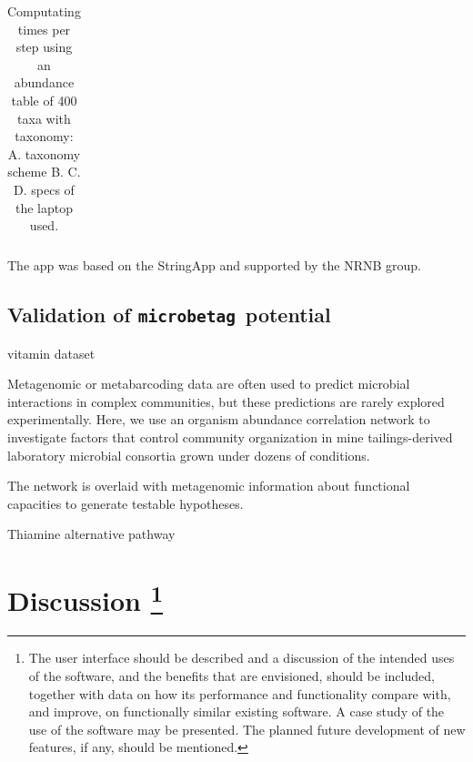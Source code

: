 \documentclass[sn-mathphys,Numbered, lineno]{sn-jnl}  %
\theoremstyle{thmstyleone}%
\theoremstyle{thmstyletwo}%
\theoremstyle{thmstylethree}%
\newcommand{\microbetag}{\texttt{microbetag }}
\begin{document}
\begin{table}[ht]
\begin{adjustbox}{width=1.3\textwidth,center=\textwidth}
\begin{tabular}{c|c}
            \end{tabular}

            \end{adjustbox}

            \caption{
                Computating times per step using an abundance table of 400 taxa with taxonomy: 
                A. taxonomy scheme 
                B. 
                C.
                D. 
                \protect\footnotemark[\value{footnote}] specs of the laptop used.
            }
            
            \label{tab:grid}
        \end{table}

        The app was based on the StringApp and supported by the NRNB group.


    \subsection*{Validation of \microbetag potential}
    \label{subsec:validation}


        vitamin dataset~\cite{hessler2023vitamin}

        Metagenomic or metabarcoding data are often used to predict microbial interactions in complex communities, but these predictions are rarely explored experimentally. 
        Here, we use an organism abundance correlation network to investigate factors that control community organization in mine tailings-derived laboratory microbial consortia grown under dozens of conditions.

        The network is overlaid with metagenomic information about functional capacities to generate testable hypotheses.


        Thiamine alternative pathway~\cite{llavero2022thiamine, romine2017underlying}~



\section*{
    Discussion
    \footnote{
        The user interface should be described and a discussion of the intended uses of the software, and the benefits that are envisioned, should be included, together with data on how its performance and functionality compare with, and improve, on functionally similar existing software. 
        A case study of the use of the software may be presented. 
        The planned future development of new features, if any, should be mentioned.
    }
}
\label{sec:discussion}
\end{document}
